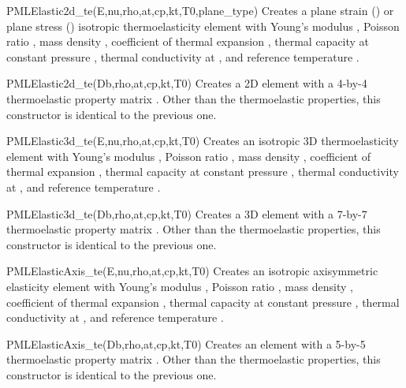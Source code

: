 \begin{codelist}
  \item[PMLElastic2d\_te(E,nu,rho,at,cp,kt,T0,plane\_type)]
    Creates a plane strain () or plane stress
    () isotropic thermoelasticity element with
    Young's modulus , Poisson ratio , mass
    density , coefficient of thermal expansion ,
    thermal capacity at constant pressure , thermal conductivity
    at , and reference temperature .

  \item[PMLElastic2d\_te(Db,rho,at,cp,kt,T0)]
    Creates a 2D element with a 4-by-4 thermoelastic property matrix
    .  Other than the thermoelastic properties, this constructor
    is identical to the previous one.

  \item[PMLElastic3d\_te(E,nu,rho,at,cp,kt,T0)]
    Creates an isotropic 3D thermoelasticity element with Young's modulus
    , Poisson ratio , mass density ,
    coefficient of thermal expansion ,
    thermal capacity at constant pressure , thermal conductivity
    at , and reference temperature .

  \item[PMLElastic3d\_te(Db,rho,at,cp,kt,T0)]
    Creates a 3D element with a 7-by-7 thermoelastic property matrix
    .  Other than the thermoelastic properties, this constructor
    is identical to the previous one.

  \item[PMLElasticAxis\_te(E,nu,rho,at,cp,kt,T0)]
    Creates an isotropic axisymmetric elasticity element with
    Young's modulus , Poisson ratio , mass density ,
    coefficient of thermal expansion ,
    thermal capacity at constant pressure , thermal conductivity
    at , and reference temperature .

  \item[PMLElasticAxis\_te(Db,rho,at,cp,kt,T0)]
    Creates an element with a 5-by-5 thermoelastic property matrix
    .  Other than the thermoelastic properties, this constructor
    is identical to the previous one.
\end{codelist}

